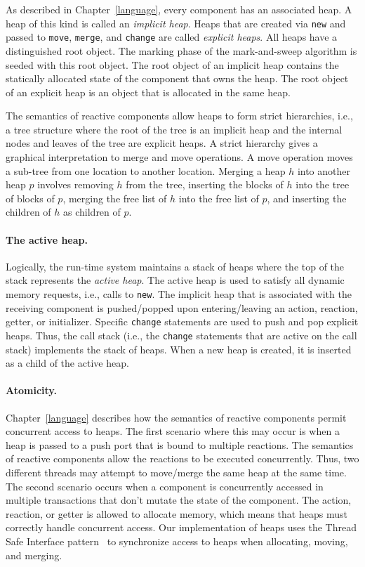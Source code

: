 As described in Chapter~\ref{language}, every component has an associated heap.
A heap of this kind is called an \emph{implicit heap}.
Heaps that are created via \verb+new+ and passed to \verb+move+, \verb+merge+, and \verb+change+ are called \emph{explicit heaps}.
All heaps have a distinguished root object.
The marking phase of the mark-and-sweep algorithm is seeded with this root object.
The root object of an implicit heap contains the statically allocated state of the component that owns the heap.
The root object of an explicit heap is an object that is allocated in the same heap.

The semantics of reactive components allow heaps to form strict hierarchies, i.e., a tree structure where the root of the tree is an implicit heap and the internal nodes and leaves of the tree are explicit heaps.
A strict hierarchy gives a graphical interpretation to merge and move operations.
A move operation moves a sub-tree from one location to another location.
 Merging a heap $h$ into another heap $p$ involves removing $h$ from the tree, inserting the blocks of $h$ into the tree of blocks of $p$, merging the free list of $h$ into the free list of $p$, and inserting the children of $h$ as children of $p$.

\paragraph{The active heap.}
Logically, the \rcgo{} run-time system maintains a stack of heaps where the top of the stack represents the \emph{active heap}.
The active heap is used to satisfy all dynamic memory requests, i.e., calls to \verb+new+.
The implicit heap that is associated with the receiving component is pushed/popped upon entering/leaving an action, reaction, getter, or initializer.
Specific \verb+change+ statements are used to push and pop explicit heaps.
Thus, the call stack (i.e., the \verb+change+ statements that are active on the call stack) implements the stack of heaps.
When a new heap is created, it is inserted as a child of the active heap.

\paragraph{Atomicity.}
Chapter~\ref{language} describes how the semantics of reactive components permit concurrent access to heaps.
The first scenario where this may occur is when a heap is passed to a push port that is bound to multiple reactions.
The semantics of reactive components allow the reactions to be executed concurrently.
Thus, two different threads may attempt to move/merge the same heap at the same time.
The second scenario occurs when a component is concurrently accessed in multiple transactions that don't mutate the state of the component.
The action, reaction, or getter is allowed to allocate memory, which means that heaps must correctly handle concurrent access.
Our implementation of heaps uses the Thread Safe Interface pattern~\cite{schmidt2000pattern} to synchronize access to heaps when allocating, moving, and merging.

